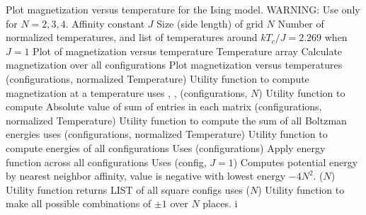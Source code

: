 \documentclass[12pt]{article}
\begin{document}
\begin{codebox}
\li  {}
\li  \Comment Plot magnetization versus temperature for the Ising model.
\li  \Comment WARNING: Use only for $N=2,3,4$.
\li  {}  Affinity constant $J$
\li  {} Size (side length) of grid $N$
\li  {} Number of normalized temperatures, and list of
\zi    temperatures around $kT_c/J = 2.269$ when $J=1$
\li  \Return Plot of magnetization versus temperature
\li  \For Temperature array
\li      \Do
               Calculate magnetization over all configurations
\li  \End
\li  Plot magnetization versus temperatures
\zi  
\li  {}(configurations, normalized Temperature)
\li   Utility function to compute magnetization at a temperature
\li   uses , , 
\zi
\li  {}(configurations, $N$)
\li   Utility function to compute
\li   Absolute value of sum of entries in each matrix
\zi
\li  {}(configurations, normalized Temperature)
\li   Utility function to compute the sum of all Boltzman energies
\li   uses 
\zi
\li  {}(configurations, normalized Temperature)
\li   Utility function to compute energies of all configurations
\li   Uses 
\zi
\li  {}(configurations)
\li   Apply energy function across all configurations
\li   Uses 
\zi
\li  {}(config, $J=1$)
\li   Computes potential energy by nearest neighbor affinity,
\li   value is negative with lowest energy $-4 N^2$.
\zi
\li  {}($N$)
\li   Utility function returns LIST of all square configs
\li   uses 
\zi
\li  {}($N$)
\li   Utility function to make all possible combinations of $\pm 1$
\li  over $N$ places.
i\end{codebox}
\end{document}
